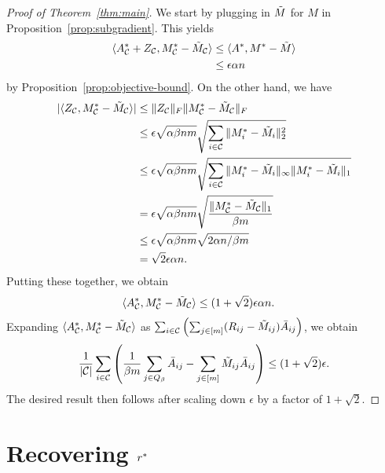\begin{proof}[Proof of Theorem~\ref{thm:main}]
We start by plugging in $\tilde{M}$ for $M$ in Proposition~\ref{prop:subgradient}. This yields
\begin{align}
\langle A^*_{\mathcal{C}} + Z_{\mathcal{C}}, M^*_{\mathcal{C}} - \tilde{M}_{\mathcal{C}} \rangle &\leq \langle A^*, M^* - \tilde{M} \rangle \\
 &\leq \epsilon \alpha n
\end{align}
by Proposition~\ref{prop:objective-bound}.
On the other hand, we have 
\begin{align}
|\langle Z_{\mathcal{C}}, M^*_{\mathcal{C}} - \tilde{M}_{\mathcal{C}} \rangle| &\leq \|Z_{\mathcal{C}}\|_F\|M^*_{\mathcal{C}} - \tilde{M}_{\mathcal{C}}\|_F \\
 &\leq \epsilon\sqrt{\alpha\beta nm} \sqrt{\sum_{i \in \mathcal{C}} \|M^*_i - \tilde{M}_i\|_2^2} \\
 &\leq \epsilon\sqrt{\alpha\beta nm} \sqrt{\sum_{i \in \mathcal{C}} \|M^*_i - \tilde{M}_i\|_{\infty}\|M^*_i - \tilde{M}_i\|_1} \\
 &=    \epsilon\sqrt{\alpha\beta nm} \sqrt{\frac{\|M^*_{\mathcal{C}}-\tilde{M}_{\mathcal{C}}\|_1}{\beta m}} \\
 &\leq \epsilon\sqrt{\alpha\beta nm} \sqrt{2\alpha n/\beta m} \\
 &= \sqrt{2}\epsilon\alpha n.
\end{align}
Putting these together, we obtain
\begin{align}
\langle A^*_{\mathcal{C}}, M^*_{\mathcal{C}} - \tilde{M}_{\mathcal{C}} \rangle &\leq (1+\sqrt{2})\epsilon \alpha n.
\end{align}
Expanding $\langle A^*_{\mathcal{C}}, M^*_{\mathcal{C}} - \tilde{M}_{\mathcal{C}} \rangle$ as 
$\sum_{i \in \mathcal{C}}\left( \sum_{j \in [m]} (R_{ij} - \tilde{M}_{ij})\bar{A}_{ij} \right)$,
we obtain 
\[ \frac{1}{|\mathcal{C}|}\sum_{i \in \mathcal{C}}\left( \frac{1}{\beta m}\sum_{j \in Q_{\beta}} \bar{A}_{ij} - \sum_{j \in [m]} \tilde{M}_{ij}\bar{A}_{ij} \right) \leq (1+\sqrt{2})\epsilon. \]
The desired result then follows after scaling down $\epsilon$ 
by a factor of $1+\sqrt{2}$.
\end{proof}

\section{Recovering $r^*$}


